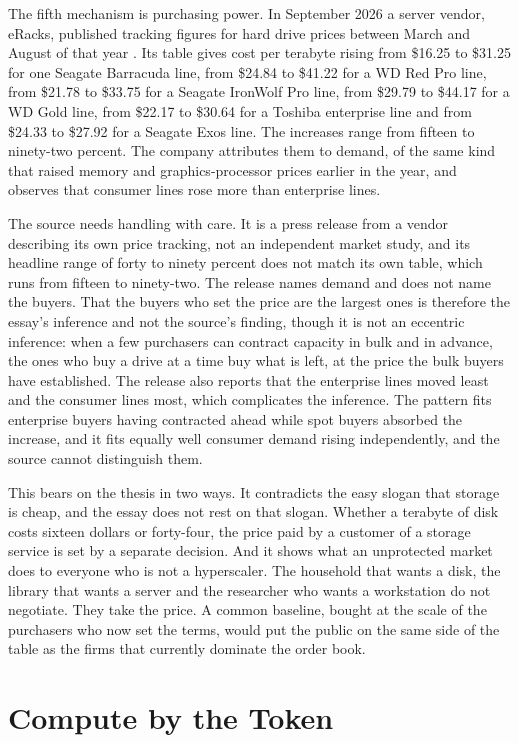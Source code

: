 \documentclass[11pt]{article}
\begin{document}
The fifth mechanism is purchasing power. In September 2026 a server vendor, eRacks, published tracking figures for hard drive prices between March and August of that year \cite{eracks}. Its table gives cost per terabyte rising from \$16.25 to \$31.25 for one Seagate Barracuda line, from \$24.84 to \$41.22 for a WD Red Pro line, from \$21.78 to \$33.75 for a Seagate IronWolf Pro line, from \$29.79 to \$44.17 for a WD Gold line, from \$22.17 to \$30.64 for a Toshiba enterprise line and from \$24.33 to \$27.92 for a Seagate Exos line. The increases range from fifteen to ninety-two percent. The company attributes them to demand, of the same kind that raised memory and graphics-processor prices earlier in the year, and observes that consumer lines rose more than enterprise lines.

The source needs handling with care. It is a press release from a vendor describing its own price tracking, not an independent market study, and its headline range of forty to ninety percent does not match its own table, which runs from fifteen to ninety-two. The release names demand and does not name the buyers. That the buyers who set the price are the largest ones is therefore the essay's inference and not the source's finding, though it is not an eccentric inference: when a few purchasers can contract capacity in bulk and in advance, the ones who buy a drive at a time buy what is left, at the price the bulk buyers have established. The release also reports that the enterprise lines moved least and the consumer lines most, which complicates the inference. The pattern fits enterprise buyers having contracted ahead while spot buyers absorbed the increase, and it fits equally well consumer demand rising independently, and the source cannot distinguish them.

This bears on the thesis in two ways. It contradicts the easy slogan that storage is cheap, and the essay does not rest on that slogan. Whether a terabyte of disk costs sixteen dollars or forty-four, the price paid by a customer of a storage service is set by a separate decision. And it shows what an unprotected market does to everyone who is not a hyperscaler. The household that wants a disk, the library that wants a server and the researcher who wants a workstation do not negotiate. They take the price. A common baseline, bought at the scale of the purchasers who now set the terms, would put the public on the same side of the table as the firms that currently dominate the order book.

\section{Compute by the Token}
\end{document}
